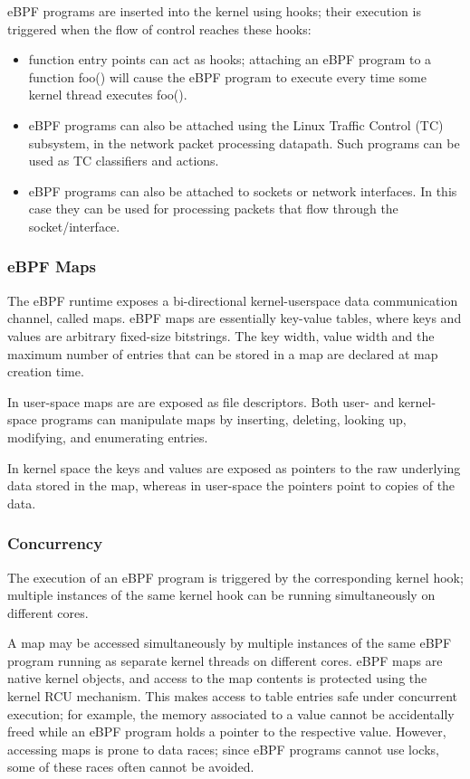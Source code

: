 eBPF programs are inserted into the kernel using hooks; their
execution is triggered when the flow of control reaches these hooks:

\begin{itemize}
\item function entry points can act as hooks; attaching an eBPF
  program to a function foo() will cause the eBPF program to execute
  every time some kernel thread executes foo().

\item eBPF programs can also be attached using the Linux Traffic
  Control (TC) subsystem, in the network packet processing
  datapath. Such programs can be used as TC classifiers and actions.

\item eBPF programs can also be attached to sockets or network
  interfaces. In this case they can be used for processing packets
  that flow through the socket/interface.
\end{itemize}

\subsubsection{eBPF Maps}

The eBPF runtime exposes a bi-directional kernel-userspace data
communication channel, called maps.  eBPF maps are essentially
key-value tables, where keys and values are arbitrary fixed-size
bitstrings.  The key width, value width and the maximum number of
entries that can be stored in a map are declared at map creation time.

In user-space maps are are exposed as file descriptors. Both user- and
kernel-space programs can manipulate maps by inserting, deleting,
looking up, modifying, and enumerating entries.

In kernel space the keys and values are exposed as pointers to the raw
underlying data stored in the map, whereas in user-space the
pointers point to copies of the data.

\subsubsection{Concurrency}

The execution of an eBPF program is triggered by the corresponding
kernel hook; multiple instances of the same kernel hook can be running
simultaneously on different cores.

A map may be accessed simultaneously by multiple instances of the same
eBPF program running as separate kernel threads on different cores.
eBPF maps are native kernel objects, and access to the map contents is
protected using the kernel RCU mechanism. This makes access to table
entries safe under concurrent execution; for example, the memory
associated to a value cannot be accidentally freed while an eBPF
program holds a pointer to the respective value.  However, accessing
maps is prone to data races; since eBPF programs cannot use locks,
some of these races often cannot be avoided.

